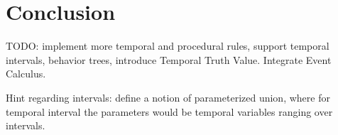 \documentclass[runningheads]{llncs}
\begin{document}
\section{Conclusion}
\label{sec:conclusion}
TODO: implement more temporal and procedural rules, support temporal
intervals, behavior trees, introduce Temporal Truth Value.  Integrate
Event Calculus.

Hint regarding intervals: define a notion of parameterized union,
where for temporal interval the parameters would be temporal variables
ranging over intervals.

%
%
 
\end{document}
